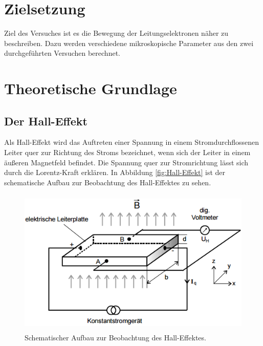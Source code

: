 \section{Zielsetzung}
\label{sec:Zielsetzung}
Ziel des Versuches ist es die Bewegung der Leitungselektronen näher zu beschreiben. Dazu werden verschiedene mikroskopische Parameter aus den
zwei durchgeführten Versuchen berechnet.

\section{Theoretische Grundlage}
\label{sec:Theorie}

\subsection{Der Hall-Effekt}
Als Hall-Effekt wird das Auftreten einer Spannung in einem Stromdurchflossenen Leiter quer zur Richtung des Stroms bezeichnet, wenn sich der Leiter in einem äußeren Magnetfeld befindet. Die Spannung quer zur Stromrichtung lässt sich durch die Lorentz-Kraft erklären. In Abbildung \eqref{fig:Hall-Effekt} ist der  schematische Aufbau zur Beobachtung des Hall-Effektes zu sehen.

\begin{figure}[H]
	\centering
	\includegraphics[height=7cm]{picture/Hall-Effekt.png}
	\caption{Schematischer Aufbau zur Beobachtung des Hall-Effektes. \cite[5]{sample}}
	\label{fig:Hall-Effekt}
\end{figure}


